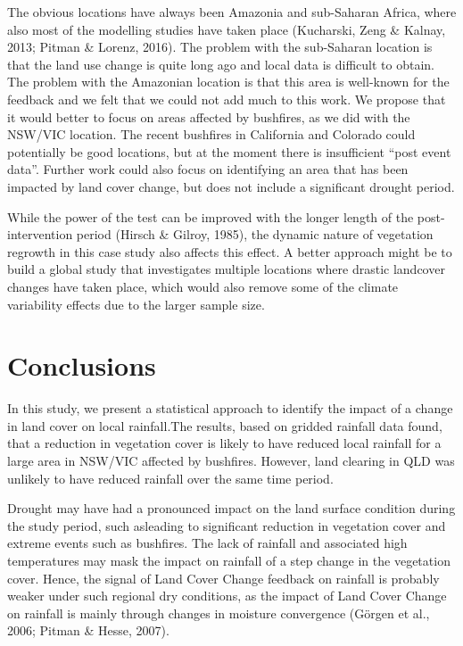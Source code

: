 \documentclass[fleqn,10pt,lineno]{wlpeerj} %
\theoremstyle{definition}
\theoremstyle{definition}
\theoremstyle{definition}
\theoremstyle{remark}
\begin{document}
The obvious locations have always been Amazonia and sub-Saharan Africa,
where also most of the modelling studies have taken place (Kucharski,
Zeng \& Kalnay, 2013; Pitman \& Lorenz, 2016). The problem with the
sub-Saharan location is that the land use change is quite long ago and
local data is difficult to obtain. The problem with the Amazonian
location is that this area is well-known for the feedback and we felt
that we could not add much to this work. We propose that it would better
to focus on areas affected by bushfires, as we did with the NSW/VIC
location. The recent bushfires in California and Colorado could
potentially be good locations, but at the moment there is insufficient
``post event data''. Further work could also focus on identifying an
area that has been impacted by land cover change, but does not include a
significant drought period.

While the power of the test can be improved with the longer length of
the post-intervention period (Hirsch \& Gilroy, 1985), the dynamic
nature of vegetation regrowth in this case study also affects this
effect. A better approach might be to build a global study that
investigates multiple locations where drastic landcover changes have
taken place, which would also remove some of the climate variability
effects due to the larger sample size.

\section{Conclusions}\label{conclusions}

In this study, we present a statistical approach to identify the impact
of a change in land cover on local rainfall.The results, based on
gridded rainfall data found, that a reduction in vegetation cover is
likely to have reduced local rainfall for a large area in NSW/VIC
affected by bushfires. However, land clearing in QLD was unlikely to
have reduced rainfall over the same time period.

Drought may have had a pronounced impact on the land surface condition
during the study period, such asleading to significant reduction in
vegetation cover and extreme events such as bushfires. The lack of
rainfall and associated high temperatures may mask the impact on
rainfall of a step change in the vegetation cover. Hence, the signal of
Land Cover Change feedback on rainfall is probably weaker under such
regional dry conditions, as the impact of Land Cover Change on rainfall
is mainly through changes in moisture convergence (Görgen et al., 2006;
Pitman \& Hesse, 2007).
\end{document}
